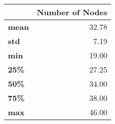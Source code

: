 \begin{tabular}{lr}
\toprule
{} &  Number of Nodes \\
\midrule
\textbf{mean} &            32.78 \\
\textbf{std } &             7.19 \\
\textbf{min } &            19.00 \\
\textbf{25\% } &            27.25 \\
\textbf{50\% } &            34.00 \\
\textbf{75\% } &            38.00 \\
\textbf{max } &            46.00 \\
\bottomrule
\end{tabular}
